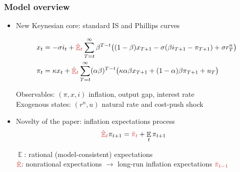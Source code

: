 \documentclass[10pt]{beamer}
\DeclareMathOperator{\E}{\mathbb{E}}
\begin{document}
\begin{frame}
	\frametitle{Model overview}
	\label{model_overview}
\begin{itemize}
\item New Keynesian core: standard IS and Phillips curves	\hfill \hyperlink{HH}{}

 \begin{align}
x_t &=  -\sigma i_t +\textcolor{brownreddark}{\hat{\E}_t} \sum_{T=t}^{\infty} \beta^{T-t }\big( (1-\beta)x_{T+1} - \sigma(\beta i_{T+1} - \pi_{T+1}) +\sigma r_T^n \big)  \label{NKIS}  \\
\pi_t &= \kappa x_t +\textcolor{brownreddark}{\hat{\E}_t} \sum_{T=t}^{\infty} (\alpha\beta)^{T-t }\big( \kappa \alpha \beta x_{T+1} + (1-\alpha)\beta \pi_{T+1} + u_T\big) \label{NKPC} 
\end{align}

Observables: $(\pi, x, i)$ inflation, output gap, interest rate \\
Exogenous states: $(r^n, u)$ natural rate and cost-push shock
\
\pause
\item \textcolor{brownreddark}{Novelty of the paper}: inflation expectations process 
\begin{align}
\textcolor{brownreddark}{\hat{\E}_{t}}\pi_{t+1} & = \textcolor{brownreddark}{\bar{\pi}_{t}} + \E_t\pi_{t+1}
\end{align}

$\E$: rational (model-consistent) expectations \\
$\textcolor{brownreddark}{\hat{\E}}$: nonrational expectations $\rightarrow$ long-run inflation expectations $ \textcolor{brownreddark}{\bar{\pi}_{t-1}} $

\end{itemize}



\end{frame}
\end{document}
